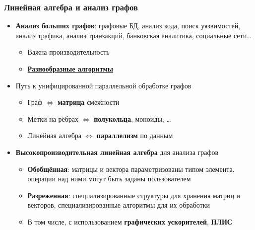 \documentclass[xcolor=table,aspectratio=169]{beamer}
\begin{document}
\begin{frame}[fragile]
  \frametitle{Линейная алгебра и анализ графов}
  \begin{itemize}
    \item \textbf{Анализ больших графов}: графовые БД, анализ кода, поиск уязвимостей, анализ трафика, анализ транзакций, банковская аналитика, социальные сети\ldots
      \begin{itemize}
        \item Важна производительность
        \item \underline{\textbf{Разнообразные алгоритмы}}
      \end{itemize}
    \pause  
    \item Путь к унифицированной параллельной обработке графов  
      \begin{itemize}
        \item Граф $\iff$ \textbf{матрица} смежности
        \item Метки на рёбрах $\iff$ \textbf{полукольца}, моноиды, \ldots
        \item Линейная алгебра $\iff$ \textbf{параллелизм} по данным
      \end{itemize}
    \pause  
    \item \textbf{Высокопроизводительная линейная алгебра} для анализа графов
      \begin{itemize}
        \item \textbf{Обобщённая}: матрицы и вектора параметризованы типом элемента, операции над ними могут быть заданы пользователем
        \item \textbf{Разреженная}: специализированные структуры для хранения матриц и векторов, специализированные алгоритмы для их обработки 
        \item В том числе, с использованием \textbf{графических ускорителей}, \textbf{ПЛИС}
      \end{itemize}
    \end{itemize}
\end{frame}
\end{document}
